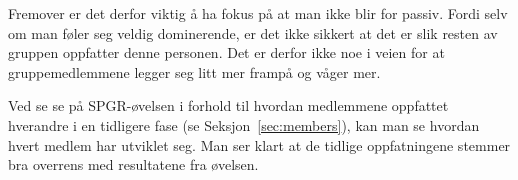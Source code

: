 Fremover er det derfor viktig å ha fokus på at man ikke blir for passiv.
Fordi selv om man føler seg veldig dominerende, er det ikke sikkert at
det er slik resten av gruppen oppfatter denne personen. Det er derfor
ikke noe i veien for at gruppemedlemmene legger seg litt mer frampå og
våger mer.

Ved se se på SPGR-øvelsen i forhold til hvordan medlemmene oppfattet
hverandre i en tidligere fase (se Seksjon~\ref{sec:members}), kan man se
hvordan hvert medlem har utviklet seg. Man ser klart at de tidlige
oppfatningene stemmer bra overrens med resultatene fra øvelsen.

